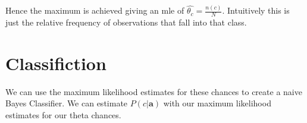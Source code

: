Hence the maximum is achieved giving an mle of $\hat{\theta_c} = \frac{n(c)}{N}$. Intuitively this is just the relative frequency of observations that fall into that class.

\section{Classifiction}

We can use the maximum likelihood estimates for these chances to create a naive Bayes Classifier. We can estimate $P(c|\mathbf{a})$ with our maximum likelihood estimates for our theta chances.